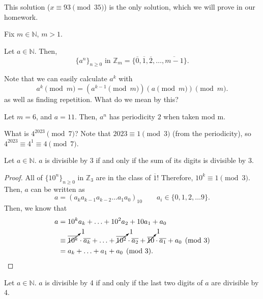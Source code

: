 \documentclass[a4paper]{article}
\begin{document}
\begin{note}
	This solution (\( x \equiv 93 \pmod {35} \)) is the only solution, which we will prove in our homework.
\end{note}


Fix \( m \in \mathbb{N} \), \( m>1 \).

Let \( a \in \mathbb{N} \). Then, \[
	\{a^n\}_{n\ge 0} \text{ in } \mathbb{Z}_m=\{\overline{0},\overline{1},\overline{2},\ldots ,\overline{m-1}    \}  
.\] 

Note that we can easily calculate \( a^k \) with \[ a^k \pmod m= \left( a^{k-1} \pmod m \right) \left( a \pmod m \right) \pmod m .\] as well as finding repetition. What do we mean by this?

\begin{eg}
	Let \( m=6 \), and \( a=11 \). Then, \( a^n \) has periodicity \( 2 \) when taken mod m.
\end{eg}

\begin{eg}
	What is \( 4^{2023} \pmod 7 \)? Note that \( 2023 \equiv 1 \pmod 3 \) (from the periodicity), so \( 4^{2023}\equiv 4^1 \equiv 4 \pmod 7  \).
\end{eg}

\begin{theorem}
	Let \( a \in \mathbb{N} \). \( a \) is divisible by 3 if and only if the sum of its digits is divisible by 3.
\end{theorem}

\begin{proof}
	All of \( \{10^n\}_{n\ge 0}  \) in \( \mathbb{Z}_3 \) are in the class of \( \overline{1}  \)! Therefore, \( 10^k \equiv 1 \pmod 3 \). Then, \( a \) can be written as \[
		a = (a_k a_{k-1} a_{k-2}\ldots a_{1}a_{0})_{10} \qquad a_i \in \{0,1,2,\ldots 9\}  
	.\] Then, we know that
	\begin{align*}
		a &= 10^k a_k + \ldots  + 10^2 a_2 + 10 a_1 + a_0 \\
			&\equiv \cancelto{1}{\overline{10^k}}\cdot \overline{a_k} + \ldots  + \cancelto{1}{\overline{10^2}}\cdot \overline{a_2}  + \cancelto{1}{\overline{10} }\cdot \overline{a_1} + a_{0} \pmod 3 \\
			&= a_k + \ldots  + a_{1} + a_{0} \pmod 3
	.\end{align*}
\end{proof}

\begin{theorem}
	Let \( a \in \mathbb{N} \). \( a \) is divisible by 4 if and only if the last two digits of \( a \) are divisible by 4.
\end{theorem}
\end{document}
